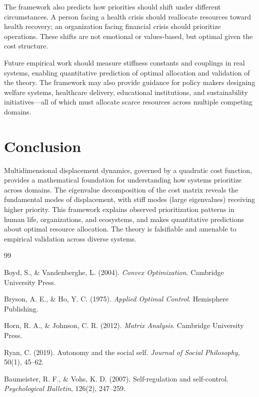 \documentclass[12pt]{article}
\begin{document}
The framework also predicts how priorities should shift under different circumstances. A person facing a health crisis should reallocate resources toward health recovery; an organization facing financial crisis should prioritize operations. These shifts are not emotional or values-based, but optimal given the cost structure.

Future empirical work should measure stiffness constants and couplings in real systems, enabling quantitative prediction of optimal allocation and validation of the theory. The framework may also provide guidance for policy makers designing welfare systems, healthcare delivery, educational institutions, and sustainability initiatives—all of which must allocate scarce resources across multiple competing domains.

\section{Conclusion}

Multidimensional displacement dynamics, governed by a quadratic cost function, provides a mathematical foundation for understanding how systems prioritize across domains. The eigenvalue decomposition of the cost matrix reveals the fundamental modes of displacement, with stiff modes (large eigenvalues) receiving higher priority. This framework explains observed prioritization patterns in human life, organizations, and ecosystems, and makes quantitative predictions about optimal resource allocation. The theory is falsifiable and amenable to empirical validation across diverse systems.

\begin{thebibliography}{99}

 Boyd, S., \& Vandenberghe, L. (2004). \textit{Convex Optimization}. Cambridge University Press.

 Bryson, A. E., \& Ho, Y. C. (1975). \textit{Applied Optimal Control}. Hemisphere Publishing.

 Horn, R. A., \& Johnson, C. R. (2012). \textit{Matrix Analysis}. Cambridge University Press.

 Ryan, C. (2019). Autonomy and the social self. \textit{Journal of Social Philosophy}, 50(1), 45--62.

 Baumeister, R. F., \& Vohs, K. D. (2007). Self-regulation and self-control. \textit{Psychological Bulletin}, 126(2), 247--259.

\end{thebibliography}
\end{document}
